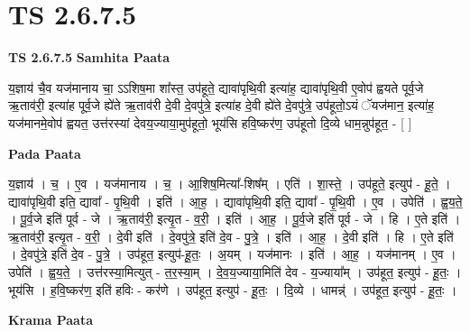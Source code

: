 \documentclass[17pt]{extarticle}
\begin{document}
\section*{ TS 2.6.7.5 }

\textbf{TS 2.6.7.5 } \newline
\textbf{Samhita Paata} \newline

य॒ज्ञाय॑ चै॒व यज॑मानाय चा॒ ऽऽशिष॒मा शा᳚स्त॒ उप॑हूते॒ द्यावा॑पृथि॒वी इत्या॑ह॒ द्यावा॑पृथि॒वी ए॒वोप॑ ह्वयते पूर्व॒जे ऋ॒ताव॑री॒ इत्या॑ह पूर्व॒जे ह्ये॑ते ऋ॒ताव॑री दे॒वी दे॒वपु॑त्रे॒ इत्या॑ह दे॒वी ह्ये॑ते दे॒वपु॑त्रे॒ उप॑हूतो॒ऽयं ॅयज॑मान॒ इत्या॑ह॒ यज॑मानमे॒वोप॑ ह्वयत॒ उत्त॑रस्यां देवय॒ज्याया॒मुप॑हूतो॒ भूय॑सि हवि॒ष्कर॑ण॒ उप॑हूतो दि॒व्ये धाम॒न्नुप॑हूत॒ - [  ] \newline

\textbf{Pada Paata} \newline

य॒ज्ञाय॑ । च॒ । ए॒व । यज॑मानाय । च॒ । आ॒शिष॒मित्या᳚-शिष᳚म् । एति॑ । शा॒स्ते॒ । उप॑हूते॒ इत्युप॑ - हू॒ते॒ । द्यावा॑पृथि॒वी इति॒ द्यावा᳚ - पृ॒थि॒वी । इति॑ । आ॒ह॒ । द्यावा॑पृथि॒वी इति॒ द्यावा᳚ - पृ॒थि॒वी । ए॒व । उपेति॑ । ह्व॒य॒ते॒ । पू॒र्व॒जे इति॑ पूर्व - जे । ऋ॒ताव॑री॒ इत्यृ॒त - व॒री॒ । इति॑ । आ॒ह॒ । पू॒र्व॒जे इति॑ पूर्व - जे । हि । ए॒ते इति॑ । ऋ॒ताव॑री॒ इत्यृ॒त - व॒री॒ । दे॒वी इति॑ । दे॒वपु॑त्रे॒ इति॑ दे॒व - पु॒त्रे॒ । इति॑ । आ॒ह॒ । दे॒वी इति॑ । हि । ए॒ते इति॑ । दे॒वपु॑त्रे॒ इति॑ दे॒व - पु॒त्रे॒ । उप॑हूत॒ इत्युप॑-हू॒तः॒ । अ॒यम् । यज॑मानः । इति॑ । आ॒ह॒ । यज॑मानम् । ए॒व । उपेति॑ । ह्व॒य॒ते॒ । उत्त॑रस्या॒मित्युत् - त॒र॒स्या॒म् । दे॒व॒य॒ज्याया॒मिति॑ देव - य॒ज्याया᳚म् । उप॑हूत॒ इत्युप॑ - हू॒तः॒ । भूय॑सि । ह॒वि॒ष्कर॑ण॒ इति॑ हविः - कर॑णे । उप॑हूत॒ इत्युप॑ - हू॒तः॒ । दि॒व्ये । धामन्न्॑ । उप॑हूत॒ इत्युप॑ - हू॒तः॒ ।  \newline


\textbf{Krama Paata} \newline
\end{document}
